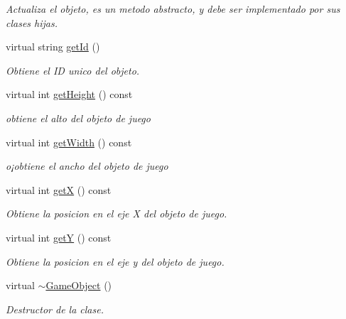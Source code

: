 \begin{DoxyCompactItemize}
\begin{DoxyCompactList}\small\item\em Actualiza el objeto, es un metodo abstracto, y debe ser implementado por sus clases hijas. \end{DoxyCompactList}\item 
virtual string \hyperlink{class_game_object_a340e4594b8eafacc5bd6f7e390b43f53}{get\-Id} ()
\begin{DoxyCompactList}\small\item\em Obtiene el I\-D unico del objeto. \end{DoxyCompactList}\item 
virtual int \hyperlink{class_game_object_a2553f445dc1aa30defaa3bc0875927ba}{get\-Height} () const 
\begin{DoxyCompactList}\small\item\em obtiene el alto del objeto de juego \end{DoxyCompactList}\item 
virtual int \hyperlink{class_game_object_a3c6c20c513c069dc2cf6aee2649581b2}{get\-Width} () const 
\begin{DoxyCompactList}\small\item\em o¡obtiene el ancho del objeto de juego \end{DoxyCompactList}\item 
virtual int \hyperlink{class_game_object_a8f9c430b6cef5177a0a7f8649e749d10}{get\-X} () const 
\begin{DoxyCompactList}\small\item\em Obtiene la posicion en el eje X del objeto de juego. \end{DoxyCompactList}\item 
virtual int \hyperlink{class_game_object_a3ae8f58696691791813f0c58af6fffd8}{get\-Y} () const 
\begin{DoxyCompactList}\small\item\em Obtiene la posicion en el eje y del objeto de juego. \end{DoxyCompactList}\item 
\hypertarget{class_game_object_ab82dfdb656f9051c0587e6593b2dda97}{virtual \hyperlink{class_game_object_ab82dfdb656f9051c0587e6593b2dda97}{$\sim$\-Game\-Object} ()}\label{class_game_object_ab82dfdb656f9051c0587e6593b2dda97}

\begin{DoxyCompactList}\small\item\em Destructor de la clase. \end{DoxyCompactList}\end{DoxyCompactItemize}
